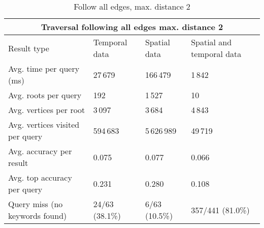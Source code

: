 \begin{table}
	\caption{Follow all edges, max. distance 2}
	\label{table:followAll2}
	\begin{tabular}{ |p{3cm}||p{3cm}|p{3cm}|p{3cm}|  }
		\hline
		\multicolumn{4}{|c|}{Traversal following all edges max. distance 2}                         \\
		\hline
		Result type                    & Temporal data  & Spatial data  & Spatial and temporal data	\\
		\hline
		Avg. time per query (ms)       & 27\,679        & 166\,479      & 1\,842                    \\
		Avg. roots per query           & 192            & 1\,527        & 10                        \\
		Avg. vertices per root            & 3\,097         & 3\,684        & 4\,843                    \\
		Avg. vertices visited per query   & 594\,683       & 5\,626\,989   & 49\,719                   \\
		Avg. accuracy per result       & 0.075          & 0.077         & 0.066                     \\
		Avg. top accuracy per query    & 0.231          & 0.280         & 0.108                     \\
		Query miss (no keywords found) & 24/63 (38.1\%) & 6/63 (10.5\%) & 357/441 (81.0\%)          \\
		\hline
	\end{tabular}
\end{table}